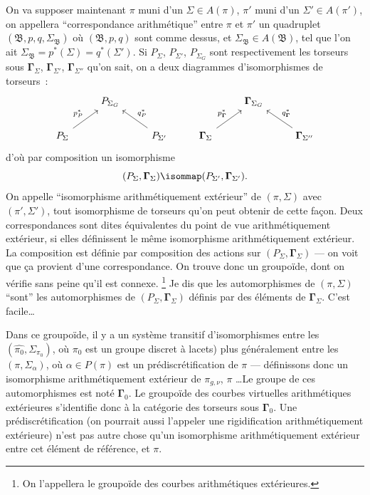 On va supposer maintenant $\pi$ muni d'un $\Sigma\in A(\pi)$, $\pi'$ muni d'un $\Sigma'\in A(\pi')$, on appellera ``correspondance arithmétique'' entre $\pi$ et $\pi'$ un quadruplet $(\mathfrak{B},p,q,\Sigma_{\mathfrak{B}})$ où $(\mathfrak{B},p,q)$ sont comme dessus, et $\Sigma_{\mathfrak{B}}\in A(\mathfrak{B})$, tel que l'on ait $\Sigma_{\mathfrak{B}}=p^*(\Sigma)=q^*(\Sigma')$.  Si $P_\Sigma$, $P_{\Sigma'}$, $P_{\Sigma_G}$ sont respectivement les torseurs sous $\boldsymbol{\Gamma}_\Sigma$, $\boldsymbol{\Gamma}_{\Sigma'}$, $\boldsymbol{\Gamma}_{\Sigma''}$ qu'on sait, on a deux diagrammes d'isomorphismes de torseurs~:
\[\begin{tikzcd}
	& {P_{\Sigma_G}} &&& {\boldsymbol{\Gamma}_{\Sigma_G}} \\
	{P_\Sigma} && {P_{\Sigma'}} & {\boldsymbol{\Gamma}_\Sigma} && {\boldsymbol{\Gamma}_{\Sigma''}}
	\arrow["{p^*_P}", from=2-1, to=1-2]
	\arrow["{q^*_P}"', from=2-3, to=1-2]
	\arrow["{p^*_{\boldsymbol{\Gamma}}}", from=2-4, to=1-5]
	\arrow["{q^*_{\boldsymbol{\Gamma}}}"', from=2-6, to=1-5]
\end{tikzcd}\]
d'où par composition un isomorphisme 
$$
(P_\Sigma,\boldsymbol{\Gamma}_\Sigma)\isommap (P_{\Sigma'},
\boldsymbol{\Gamma}_{\Sigma'}).
$$
On appelle ``isomorphisme arithmétiquement extérieur'' de $(\pi,\Sigma)$ avec $(\pi',\Sigma')$, tout isomorphisme de torseurs qu'on peut obtenir de cette fa\c con. Deux correspondances sont dites équivalentes du point de vue arithmétiquement extérieur, si elles définissent le même isomorphisme arithmétiquement extérieur. La composition est définie par composition des actions sur $(P_\Sigma,\boldsymbol{\Gamma}_\Sigma)$ --- on voit que \c{c}a provient d'une correspondance. On trouve donc un groupoïde, dont on vérifie sans peine qu'il est connexe. \footnote{On l'appellera le groupoïde des courbes  arithmétiques extérieures.} Je dis que les automorphismes de $(\pi,\Sigma)$ ``sont'' les automorphismes de $(P_\Sigma,\boldsymbol{\Gamma}_\Sigma)$ définis par des éléments de $\boldsymbol{\Gamma}_\Sigma$. C'est facile\dots

Dans ce groupoïde, il y a un système transitif d'isomorphismes entre les $(\hat{\pi_0},\Sigma_{\pi_0})$, où $\pi_0$ est un groupe discret à lacets) plus généralement entre les $(\pi,\Sigma_\alpha)$, où $\alpha\in P(\pi)$ est un prédiscrétification de $\pi$ --- définissons donc un isomorphisme arithmétiquement extérieur de $\pi_{g,\nu}$, $\pi$ \dots  Le groupe de ces automorphismes est noté $\boldsymbol{\Gamma}_0$. Le groupoïde des courbes virtuelles arithmétiques extérieures s'identifie donc à la catégorie des torseurs sous $\boldsymbol{\Gamma}_0$. Une prédiscrétification (on pourrait aussi l'appeler une rigidification arithmétiquement extérieure) n'est pas autre chose qu'un isomorphisme arithmétiquement extérieur entre cet élément de référence, et $\pi$.


